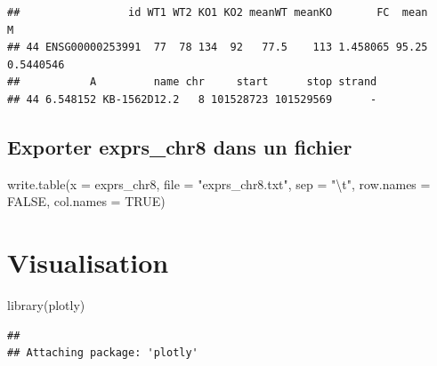 \documentclass[
]{book}
\newenvironment{Shaded}{\begin{snugshade}}{\end{snugshade}}
\newcommand{\AttributeTok}[1]{\textcolor[rgb]{0.77,0.63,0.00}{#1}}
\newcommand{\ConstantTok}[1]{\textcolor[rgb]{0.00,0.00,0.00}{#1}}
\newcommand{\DecValTok}[1]{\textcolor[rgb]{0.00,0.00,0.81}{#1}}
\newcommand{\FunctionTok}[1]{\textcolor[rgb]{0.00,0.00,0.00}{#1}}
\newcommand{\NormalTok}[1]{#1}
\newcommand{\OtherTok}[1]{\textcolor[rgb]{0.56,0.35,0.01}{#1}}
\newcommand{\SpecialCharTok}[1]{\textcolor[rgb]{0.00,0.00,0.00}{#1}}
\newcommand{\StringTok}[1]{\textcolor[rgb]{0.31,0.60,0.02}{#1}}
\begin{document}
\begin{Shaded}
\end{Shaded}

\begin{verbatim}
##                 id WT1 WT2 KO1 KO2 meanWT meanKO       FC  mean         M
## 44 ENSG00000253991  77  78 134  92   77.5    113 1.458065 95.25 0.5440546
##           A         name chr     start      stop strand
## 44 6.548152 KB-1562D12.2   8 101528723 101529569      -
\end{verbatim}

\hypertarget{exporter-exprs_chr8-dans-un-fichier}{%
\subsection{Exporter exprs\_chr8 dans un fichier}\label{exporter-exprs_chr8-dans-un-fichier}}

\begin{Shaded}
\begin{Highlighting}[]
\FunctionTok{write.table}\NormalTok{(}\AttributeTok{x =}\NormalTok{ exprs\_chr8, }\AttributeTok{file =} \StringTok{"exprs\_chr8.txt"}\NormalTok{, }
   \AttributeTok{sep =} \StringTok{"}\SpecialCharTok{\textbackslash{}t}\StringTok{"}\NormalTok{, }
   \AttributeTok{row.names =} \ConstantTok{FALSE}\NormalTok{, }
   \AttributeTok{col.names =} \ConstantTok{TRUE}\NormalTok{)}
\end{Highlighting}
\end{Shaded}

\hypertarget{visualisation-1}{%
\section{Visualisation}\label{visualisation-1}}

\begin{Shaded}
\begin{Highlighting}[]
\FunctionTok{library}\NormalTok{(plotly)}
\end{Highlighting}
\end{Shaded}

\begin{verbatim}
## 
## Attaching package: 'plotly'
\end{verbatim}
\end{document}
